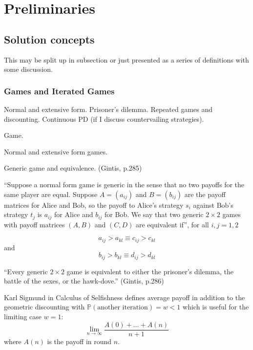 \chapter{Preliminaries}

\section{Solution concepts}
This may be split up in subsection or just presented as a series of definitions with some discussion.

\subsection{Games and Iterated Games}
Normal and extensive form. Prisoner's dilemma. Repeated games and discounting. Continuous PD (if I discuss countervailing strategies).

\begin{definition}
Game.
\end{definition}
\begin{definition}
Normal and extensive form games.
\end{definition}
\begin{definition}
Generic game and equivalence. (Gintis, p.285)

``Suppose a normal form game is generic in the sense that no two payoffs for the same player are equal. Suppose $A = (a_{ij})$ and $B = (b_{ij})$ are the payoff matrices for Alice and Bob, so the payoff to Alice's strategy $s_i$ against Bob's strategy $t_j$ is $a_{ij}$ for Alice and $b_{ij}$ for Bob. We say that two generic $2 \times 2$ games with payoff matrices $(A, B)$ and $(C, D)$ are equivalent if'', for all $i, j = 1, 2$

\[
a_{ij} > a_{kl} \equiv c_{ij} > c_{kl}
\]
and
\[
b_{ij} > b_{kl} \equiv d_{ij} > d_{kl}
\]


\end{definition}

\begin{proposition}
``Every generic $2 \times 2$ game is equivalent to either the prisoner's dilemma, the battle of the sexes, or the hawk-dove.'' (Gintis, p.286)
\end{proposition}

Karl Sigmund in Calculus of Selfishness defines average payoff in addition to the geometric discounting with
$
\mathbb{P}(\mbox{another iteration}) = w < 1
$
which is useful for the limiting case $w=1$:
\[
\lim_{n \rightarrow \infty} \frac{A(0) + \dots + A(n)}{n+1}
\]
where $A(n)$ is the payoff in round $n$.

